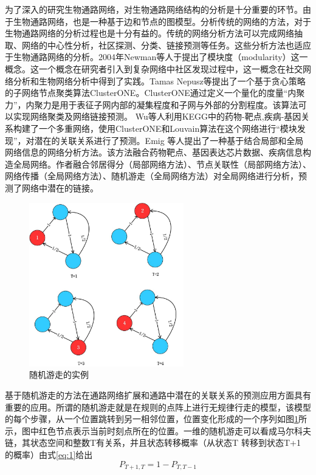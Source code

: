 为了深入的研究生物通路网络，对生物通路网络结构的分析是十分重要的环节。由于生物通路网络，也是一种基于边和节点的图模型。分析传统的网络的方法，对于生物通路网络的分析过程也是十分有益的。传统的网络分析方法可以完成网络抽取、网络的中心性分析，社区探测、分类、链接预测等任务。这些分析方法也适应于生物通路网络的分析。2004年Newman\cite{newman2006modularity}等人于提出了模块度（modularity）这一概念。这一个概念在研究者引入到复杂网络中社区发现过程中，这一概念在社交网络分析和生物网络分析中得到了实践。Tamas Nepusz\cite{nepusz2012detecting}等提出了一个基于贪心策略的子网络节点聚类算法ClusterONE\cite{nepusz2012detecting}。ClusterONE通过定义一个量化的度量“内聚力”，内聚力是用于表征子网内部的凝集程度和子网与外部的分割程度。该算法可以实现网络聚类及网络链接预测。 Wu\cite{wu2013computational}等人利用KEGG\cite{kanehisa2008kegg}中的药物-靶点,疾病-基因关系构建了一个多重网络，使用ClusterONE\cite{nepusz2012detecting}和Louvain\cite{blondel2008fast}算法在这个网络进行“模块发现”，对潜在的关联关系进行了预测。Emig \cite{emig2013drug}等人提出了一种基于结合局部和全局网络信息的网络分析方法。该方法融合药物靶点、基因表达芯片数据、疾病信息构造全局网络。作者融合邻居得分（局部网络方法）、节点关联性（局部网络方法）、网络传播（全局网络方法）、随机游走（全局网络方法）对全局网络进行分析，预测了网络中潜在的链接。

\begin{figure}
\centering
\includegraphics[width = 0.6\textwidth]{rw}
\caption[fig2]{随机游走的实例}
\label{fig2}
\end{figure}


基于随机游走的方法在通路网络扩展和通路中潜在的关联关系的预测应用方面具有重要的应用。所谓的随机游走就是在规则的点阵上进行无规律行走的模型，该模型的每个步骤，从一个位置跳转到另一相邻位置，位置变化形成的一个序列如图\ref{fig2}所示，图中红色节点表示当前时刻点所在的位置。一维的随机游走可以看成马尔科夫链，其状态空间和整数T有关系，并且状态转移概率（从状态T 转移到状态T+1 的概率）由式\ref{eq:1}给出
\begin{equation}\label{eq:1}
	P_{T+1,T} = 1-P_{T,T-1}
\end{equation}

